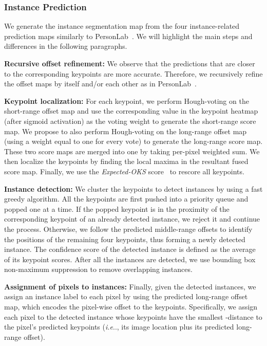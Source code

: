\documentclass[10pt,twocolumn,letterpaper]{article}
\makeatletter
\def\@onedot{\ifx\@let@token.\else.\null\fi\xspace}
\DeclareRobustCommand\onedot{\futurelet\@let@token\@onedot}
\def\ie{\emph{i.e}\onedot} \def\Ie{\emph{I.e}\onedot}
\makeatother
\begin{document}
\subsubsection{Instance Prediction}
\label{sec:fuse_instance}
We generate the instance segmentation map from the four instance-related prediction maps similarly to PersonLab~\cite{papandreou2018personlab}. We will highlight the main steps and differences in the following paragraphs.

\textbf{Recursive offset refinement:} We observe that the predictions that are closer to the corresponding keypoints are more accurate. Therefore, we recursively refine the offset maps by itself and/or each other as in PersonLab~\cite{papandreou2018personlab}.

\textbf{Keypoint localization:} For each keypoint, we perform Hough-voting on the short-range offset map and use the corresponding value in the keypoint heatmap (after sigmoid activation) as the voting weight to generate the short-range score map. We propose to also perform Hough-voting on the long-range offset map (using a weight equal to one for every vote) to generate the long-range score map. These two score maps are merged into one by taking per-pixel weighted sum. We then localize the keypoints by finding the local maxima in the resultant fused score map. Finally, we use the \emph{Expected-OKS} score~\cite{papandreou2018personlab} to rescore all keypoints.

\textbf{Instance detection: } We cluster the keypoints to detect instances by using a fast greedy algorithm. All the keypoints are first pushed into a priority queue and popped one at a time. If the popped keypoint is in the proximity of the corresponding keypoint of an already detected instance, we reject it and continue the process. Otherwise, we follow the predicted middle-range offsets to identify the positions of the remaining four keypoints, thus forming a newly detected instance. The confidence score of the detected instance is defined as the average of its keypoint scores. After all the instances are detected, we use bounding box non-maximum suppression to remove overlapping instances.

\textbf{Assignment of pixels to instances:} Finally, given the detected instances, we assign an instance label to each pixel by using the predicted long-range offset map, which encodes the pixel-wise offset to the keypoints. Specifically, we assign each pixel to the detected instance whose keypoints have the smallest -distance to the pixel's predicted keypoints (\ie, its image location plus its predicted long-range offset).
\end{document}
